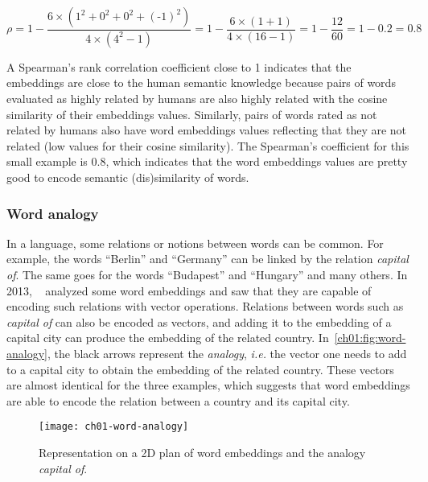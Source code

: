       \begin{equation*}
        \rho = 1 - \frac{6 \times (1^2 + 0^2 + 0^2 + (\text{-}1)^2)}
                        {4 \times (4^2 - 1)}
             = 1 - \frac{6 \times (1 + 1)}{4 \times (16 - 1)}
             = 1 - \frac{12}{60} = 1 - 0.2 = 0.8
      \end{equation*}

      A Spearman's rank correlation coefficient close to 1 indicates that the
      embeddings are close to the human semantic knowledge because pairs of
      words evaluated as highly related by humans are also highly related with
      the cosine similarity of their embeddings values. Similarly, pairs of
      words rated as not related by humans also have word embeddings values
      reflecting that they are not related (low values for their cosine
      similarity). The Spearman's coefficient for this small example is $0.8$,
      which indicates that the word embeddings values are pretty good to encode
      semantic (dis)similarity of words.

    \subsubsection{Word analogy}
      \label{ch01:subsubsec:word-analogy}
      In a language, some relations or notions between words can be common. For
      example, the words ``Berlin'' and ``Germany'' can be linked by the
      relation \textit{capital of}. The same goes for the words ``Budapest'' and
      ``Hungary'' and many others. In 2013,
      \citeauthor{mikolov2013efficient}~\citep{mikolov2013efficient} analyzed
      some word embeddings and saw that they are capable of encoding such
      relations with vector operations. Relations between words such as
      \textit{capital of} can also be encoded as vectors, and adding it
      to the embedding of a capital city can produce the embedding of the
      related country. In~\autoref{ch01:fig:word-analogy}, the black arrows
      represent the \textit{analogy}, \textit{i.e.} the vector one needs to add
      to a capital city to obtain the embedding of the related country. These
      vectors are almost identical for the three examples, which suggests that
      word embeddings are able to encode the relation between a country and its
      capital city.

      \begin{figure}[h!]
        \centering
        \texttt{[image: ch01-word-analogy]}
        \caption{Representation on a 2D plan of word embeddings and the
        analogy \textit{capital of}.}
        \label{ch01:fig:word-analogy}
      \end{figure}

